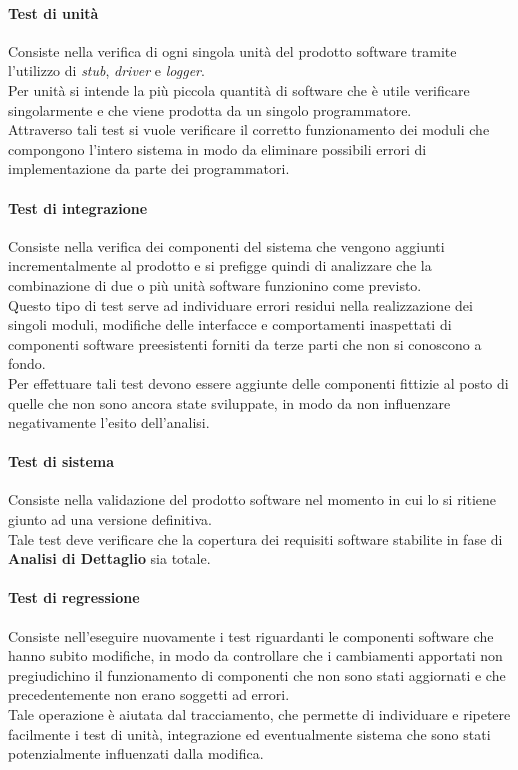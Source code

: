 \paragraph{Test di unità}
Consiste nella verifica di ogni singola unità del prodotto software tramite l'utilizzo di \textit{stub}, \textit{driver} e \textit{logger}.\\
Per unità si intende la più piccola quantità di software che è utile verificare singolarmente e che viene prodotta da un singolo programmatore.\\
Attraverso tali test si vuole verificare il corretto funzionamento dei moduli che compongono l'intero sistema in modo da eliminare possibili errori di implementazione da parte dei programmatori.

\paragraph{Test di integrazione}
Consiste nella verifica dei componenti del sistema che vengono aggiunti incrementalmente al prodotto e si prefigge quindi di analizzare che la combinazione di due o più unità software funzionino come previsto.\\
Questo tipo di test serve ad individuare errori residui nella realizzazione dei singoli moduli, modifiche delle interfacce e comportamenti inaspettati di componenti software preesistenti forniti da terze parti che non si conoscono a fondo.\\
Per effettuare tali test devono essere aggiunte delle componenti fittizie al posto di quelle che non sono ancora state sviluppate, in modo da non influenzare negativamente l'esito dell'analisi.

\paragraph{Test di sistema}
Consiste nella validazione del prodotto software nel momento in cui lo si ritiene giunto ad una versione definitiva.\\
Tale test deve verificare che la copertura dei requisiti software stabilite in fase di \textbf{Analisi di Dettaglio} sia totale.

\paragraph{Test di regressione}
Consiste nell'eseguire nuovamente i test riguardanti le componenti software che hanno subito modifiche, in modo da controllare che i cambiamenti apportati non pregiudichino il funzionamento di componenti che non sono stati aggiornati e che precedentemente non erano soggetti ad errori.\\
Tale operazione è aiutata dal tracciamento, che permette di individuare e ripetere facilmente i test di unità, integrazione ed eventualmente sistema che sono stati potenzialmente influenzati dalla modifica.

